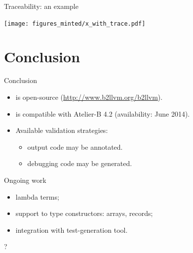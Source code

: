 \documentclass[12pt]{beamer}
\begin{document}
\begin{frame}{Traceability: an example}

\texttt{[image: figures\_minted/x\_with\_trace.pdf]}

\end{frame}

\section{Conclusion}

\begin{frame}{Conclusion}

\begin{itemize}
\item \bllvm is open-source (\url{http://www.b2llvm.org/b2llvm}).
\item \bllvm is compatible with Atelier-B 4.2 (availability: June 2014).
\item Available validation strategies: 
\begin{itemize}
\item output code may be annotated.
\item debugging code may be generated.
\end{itemize}
\end{itemize}
\end{frame}

\begin{frame}{Ongoing work}
\begin{itemize}
\item lambda terms;
\item support to type constructors: arrays, records;
\item integration with test-generation tool.
\end{itemize}

\end{frame}

\begin{frame}

\begin{center}
\huge ?
\end{center}

\end{frame}
\end{document}
